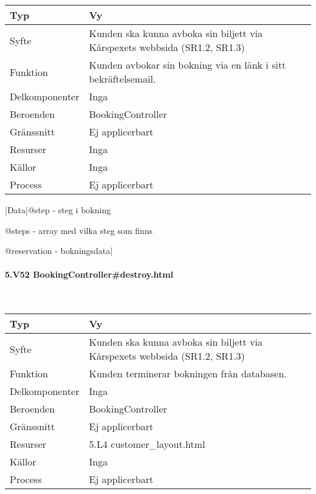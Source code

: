 \documentclass[a4paper, twoside, 11pt, titlepage]{article}
\begin{document}
			\begin {table} [ht] \begin{tabular} {  p{3.5cm} p{9.6cm} }
				\hline
				Typ & Vy  \\
				\hline
				Syfte & Kunden ska kunna avboka sin biljett via Kårspexets webbsida (SR1.2, SR1.3)  \\
				\hline
				Funktion & Kunden avbokar sin bokning via en länk i sitt bekräftelsemail.  \\
				\hline
				Delkomponenter & Inga  \\
				\hline
				Beroenden & BookingController  \\
				\hline
				Gränssnitt & Ej applicerbart  \\
				\hline
				Resurser & Inga  \\
				\hline
				Källor & Inga  \\
				\hline
				Process & Ej applicerbart  \\
				\hline
			\end{tabular} \end{table} \FloatBarrier
			\vspace{6mm}

			|Data|@step - steg i bokning

			@steps - array med vilka steg som finns

			@reservation - bokningsdata|

			\paragraph{5.V52 BookingController\#destroy.html}\

			\begin {table} [ht] \begin{tabular} {  p{3.5cm} p{9.6cm} }
				\hline
				Typ & Vy  \\
				\hline
				Syfte & Kunden ska kunna avboka sin biljett via Kårspexets webbsida (SR1.2, SR1.3)  \\
				\hline
				Funktion & Kunden terminerar bokningen från databasen.  \\
				\hline
				Delkomponenter & Inga  \\
				\hline
				Beroenden & BookingController  \\
				\hline
				Gränssnitt & Ej applicerbart  \\
				\hline
				Resurser & 5.L4 customer\_layout.html  \\
				\hline
				Källor & Inga  \\
				\hline
				Process & Ej applicerbart  \\
				\hline
			\end{tabular} \end{table} \FloatBarrier
			\vspace{6mm}
\end{document}
